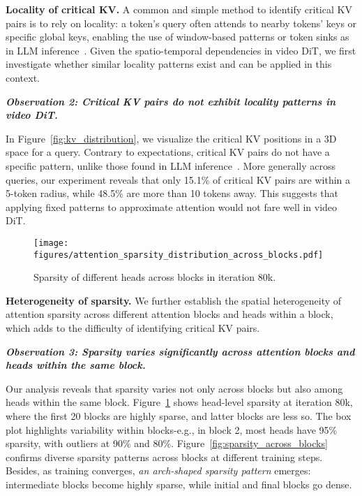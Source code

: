 \noindent\textbf{Locality of critical KV.} 
A common and simple method to identify critical KV pairs is to rely on locality: a token's query often attends to nearby tokens' keys or specific global keys, enabling the use of window-based patterns or token sinks as in LLM inference~\cite{xiao2023streamllm,mistral7b,zhang2023h2o}. Given the spatio-temporal dependencies in video DiT, we first investigate whether similar locality patterns exist and can be applied in this context.




\hypertarget{obs2}{
\textbf{\textit{Observation 2: Critical KV pairs do not exhibit locality patterns in video DiT.}}}



In Figure~\ref{fig:kv_distribution}, we visualize the critical KV positions in a 3D space for a query. Contrary to expectations, critical KV pairs do not have a specific pattern, unlike those found in LLM inference~\cite{xiao2023streamllm,mistral7b,zhang2023h2o}. 
More generally across queries, our experiment reveals that only 15.1\% of critical KV pairs are within a 5-token radius, while 48.5\% are more than 10 tokens away. 
This suggests that applying fixed patterns to approximate attention would not fare well in video DiT.


\begin{figure}[t]
  \centering
  \texttt{[image: figures/attention\_sparsity\_distribution\_across\_blocks.pdf]} 

\caption{Sparsity of different heads across blocks in iteration 80k. }
  \label{fig:atten_sparsity_dist} 
\end{figure}

\noindent\textbf{Heterogeneity of sparsity.} 
We further establish the spatial heterogeneity of attention sparsity across different attention blocks and heads within a block, which adds to the difficulty of identifying critical KV pairs.


\hypertarget{obs3}{
\textbf{\textit{Observation 3: Sparsity varies significantly across attention blocks and heads within the same block.}}}

Our analysis reveals that sparsity varies not only across blocks but also among heads within the same block. Figure~\ref{fig:atten_sparsity_dist} shows head-level sparsity at iteration 80k, where the first 20 blocks are highly sparse, and latter blocks are less so. The box plot highlights variability within blocks-e.g., in block 2, most heads have 95\% sparsity, with outliers at 90\% and 80\%. Figure~\ref{fig:sparsity_across_blocks} confirms diverse sparsity patterns across blocks at different training steps. Besides, as training converges, \textit{an arch-shaped sparsity pattern} emerges: intermediate blocks become highly sparse, while initial and final blocks go dense.


